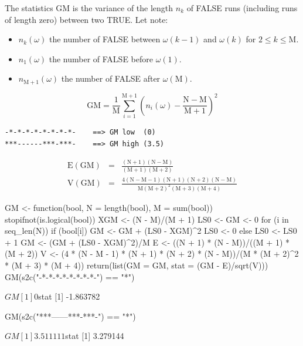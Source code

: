 \documentclass{article}
\begin{document}
The statistics $\mathrm{GM}$ is the variance of the length $n_k$ of FALSE runs (including
runs of length zero) between two TRUE. Let note:

\begin{itemize}
\item $n_k(\omega)$ the number of FALSE between $\omega(k-1)$ and $\omega(k)$ for $2 \le k \le \mathrm{M}$.
\item $n_1(\omega)$ the number of FALSE before $\omega(1)$.
\item $n_{\mathrm{M+1}}(\omega)$ the number of FALSE after $\omega(\mathrm{M})$.
\end{itemize}

$$
\mathrm{GM} = \frac{1}{\mathrm{M}}\sum_{i = 1}^{\mathrm{M+1}}{\left( n_i(\omega) - \mathrm{\frac{N-M}{M+1}} \right)^2}
$$

\begin{verbatim}
-*-*-*-*-*-*-*-*-    ==> GM low  (0)
***------***-***-    ==> GM high (3.5)
\end{verbatim}

\begin{eqnarray*}
\mathrm{E(GM)} & = & \mathrm{\frac{(N + 1)(N - M)}{(M +1)(M + 2)}} \\
\mathrm{V(GM)} & = & \mathrm{\frac{4(N - M - 1)(N + 1)(N + 2)(N - M)}{M(M + 2)^2(M + 3)(M + 4)}}
\end{eqnarray*}

\begin{Schunk}
\begin{Sinput}
 GM <- function(bool, N = length(bool), M = sum(bool)) {
     stopifnot(is.logical(bool))
     XGM <- (N - M)/(M + 1)
     LS0 <- GM <- 0
     for (i in seq_len(N)) {
         if (bool[i]) {
             GM <- GM + (LS0 - XGM)^2
             LS0 <- 0
         }
         else {
             LS0 <- LS0 + 1
         }
     }
     GM <- (GM + (LS0 - XGM)^2)/M
     E <- ((N + 1) * (N - M))/((M + 1) * (M + 2))
     V <- (4 * (N - M - 1) * (N + 1) * (N + 2) * (N - M))/(M * 
         (M + 2)^2 * (M + 3) * (M + 4))
     return(list(GM = GM, stat = (GM - E)/sqrt(V)))
 }
 GM(s2c("-*-*-*-*-*-*-*-*-") == "*")
\end{Sinput}
\begin{Soutput}
$GM
[1] 0

$stat
[1] -1.863782
\end{Soutput}
\begin{Sinput}
 GM(s2c("***------***-***-") == "*")
\end{Sinput}
\begin{Soutput}
$GM
[1] 3.511111

$stat
[1] 3.279144
\end{Soutput}
\end{Schunk}
\end{document}
